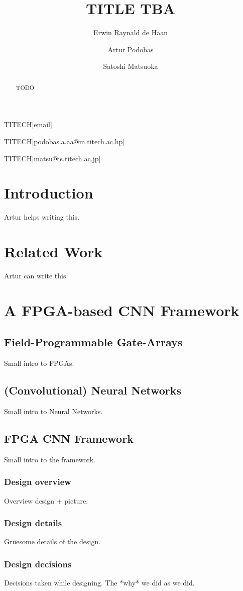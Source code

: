 \documentclass[techrep,english]{ipsj}
\begin{document}
\title{TITLE TBA}

\author{Erwin Raynald de Haan}{TITECH}[email]
\author{Artur Podobas}{TITECH}[podobas.a.aa@m.titech.ac.hp]
\author{Satoshi Matsuoka}{TITECH}[matsu@is.titech.ac.jp]

\begin{abstract}
TODO
\end{abstract}


\maketitle

\section{Introduction}
Artur helps writing this.

\section{Related Work}
Artur can write this.

\section{A FPGA-based CNN Framework}
\subsection{Field-Programmable Gate-Arrays}
Small intro to FPGAs.

\subsection{(Convolutional) Neural Networks}
Small intro to Neural Networks.

\subsection{FPGA CNN Framework}
Small intro to the framework.
\subsubsection{Design overview}
Overview design + picture.
\subsubsection{Design details}
Gruesome details of the design.
\subsubsection{Design decisions}
Decisions taken while designing. The *why* we did as we did.
\end{document}
